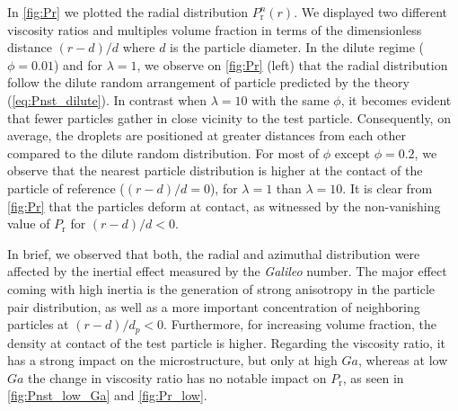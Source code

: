 In \ref{fig:Pr}  we plotted the radial distribution $P_\text{r}^n(r)$. %
We displayed two different viscosity ratios and multiples volume fraction in terms of the dimensionless distance $(r - d)/d$ where $d$ is the particle diameter. 
In the dilute regime ($\phi = 0.01$) and for $\lambda=1$, we observe on \ref{fig:Pr} (left) that the radial distribution follow the dilute random arrangement of particle predicted by the theory (\ref{eq:Pnst_dilute}). 
In contrast when $\lambda = 10$ with the same $\phi$, it becomes evident that fewer particles gather in close vicinity to the test particle. Consequently, on average, the droplets are positioned at greater distances from each other compared to the dilute random distribution. %
For most of $\phi$ except $\phi=0.2$, we observe that the nearest particle distribution is higher at the contact of the particle of reference ($(r-d)/d = 0$), for $\lambda = 1$ than $\lambda = 10$. 
It is clear from \ref{fig:Pr} that the particles deform at contact, as witnessed by the non-vanishing value of $P_\text{r}$ for $(r-d)/d<0$.

In brief, we observed that both, the radial and azimuthal distribution were affected by the inertial effect measured by the \textit{Galileo} number. 
The major effect coming with high inertia is the generation of strong anisotropy in the particle pair distribution, as well as a more important concentration of neighboring particles at $(r-d)/d_p < 0$. 
Furthermore, for increasing volume fraction, the density at contact of the test particle is higher. 
Regarding the viscosity ratio, it has a strong impact on the microstructure, but only at high $Ga$, whereas at low $Ga$ the change in viscosity ratio has no notable impact on $P_\text{r}$, as seen in \ref{fig:Pnst_low_Ga} and \ref{fig:Pr_low}. 


